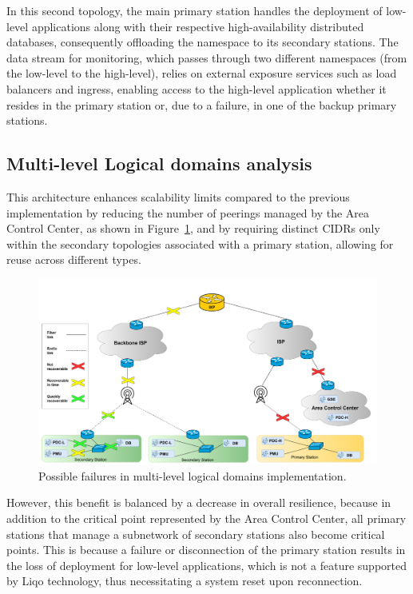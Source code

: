 In this second topology, the main primary station handles the deployment of low-level applications along with their respective high-availability distributed databases, consequently offloading the namespace to its secondary stations. The data stream for monitoring, which passes through two different namespaces (from the low-level to the high-level), relies on external exposure services such as load balancers and ingress, enabling access to the high-level application whether it resides in the primary station or, due to a failure, in one of the backup primary stations.


\subsection{Multi-level Logical domains analysis}

This architecture enhances scalability limits compared to the previous implementation by reducing the number of peerings managed by the Area Control Center,  as shown in Figure~\ref{fig:failures2}, and by requiring distinct CIDRs only within the secondary topologies associated with a primary station, allowing for reuse across different types.

\begin{figure}[ht]\centering
\includegraphics[scale=0.20]{Pictures/failures2}
\caption{Possible failures in multi-level logical domains implementation.}\label{fig:failures2}
\end{figure}

However, this benefit is balanced by a decrease in overall resilience, because in addition to the critical point represented by the Area Control Center, all primary stations that manage a subnetwork of secondary stations also become critical points. This is because a failure or disconnection of the primary station results in the loss of deployment for low-level applications, which is not a feature supported by Liqo technology, thus necessitating a system reset upon reconnection.

